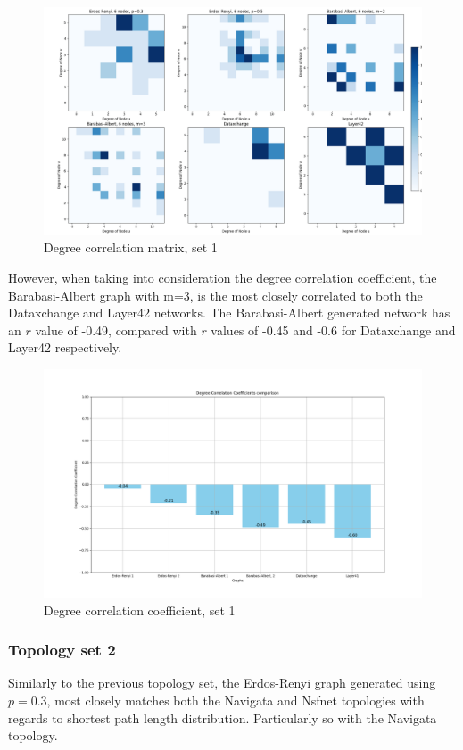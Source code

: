 \begin{figure}
    \centering
    \includegraphics[width=0.9\linewidth]{images/FINAL-TOPO-COMP/Degree-correlation-matrices/6-matrix.png}
    \caption{Degree correlation matrix, set 1}
    \label{fig:enter-label}
\end{figure}

However, when taking into consideration the degree correlation coefficient, the Barabasi-Albert graph with m=3, is the most closely correlated to both the Dataxchange and Layer42 networks. The Barabasi-Albert generated network has an $r$ value of -0.49, compared with $r$ values of -0.45 and -0.6 for Dataxchange and Layer42 respectively.  

\begin{figure}
    \centering
    \includegraphics[width=0.9\linewidth]{images/FINAL-TOPO-COMP/Degree-correlation-coeff/deg-coeff-6.png}
    \caption{Degree correlation coefficient, set 1}
    \label{fig:enter-label}
\end{figure}

\subsubsection{Topology set 2}
Similarly to the previous topology set, the Erdos-Renyi graph generated using $p=0.3$, most closely matches both the Navigata and Nsfnet topologies with regards to shortest path length distribution. Particularly so with the Navigata topology.

